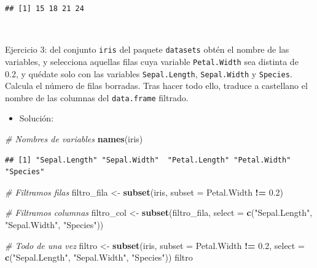 \documentclass[11pt,]{book}
\newenvironment{Shaded}{\begin{snugshade}}{\end{snugshade}}
\newcommand{\CommentTok}[1]{\textcolor[rgb]{0.37,0.37,0.37}{\textit{#1}}}
\newcommand{\DataTypeTok}[1]{\textcolor[rgb]{0.27,0.27,0.27}{#1}}
\newcommand{\FloatTok}[1]{\textcolor[rgb]{0.06,0.06,0.06}{#1}}
\newcommand{\KeywordTok}[1]{\textcolor[rgb]{0.27,0.27,0.27}{\textbf{#1}}}
\newcommand{\NormalTok}[1]{#1}
\newcommand{\OperatorTok}[1]{\textcolor[rgb]{0.43,0.43,0.43}{\textbf{#1}}}
\newcommand{\StringTok}[1]{\textcolor[rgb]{0.5,0.5,0.5}{#1}}
\providecommand{\tightlist}{%
  \setlength{\itemsep}{0pt}\setlength{\parskip}{0pt}}
\begin{document}
\begin{verbatim}
## [1] 15 18 21 24
\end{verbatim}

~

Ejercicio 3: del conjunto \texttt{iris} del paquete \texttt{datasets} obtén el nombre de las variables, y selecciona aquellas filas cuya variable \texttt{Petal.Width} sea distinta de 0.2, y quédate solo con las variables \texttt{Sepal.Length}, \texttt{Sepal.Width} y \texttt{Species}. Calcula el número de filas borradas. Tras hacer todo ello, traduce a castellano el nombre de las columnas del \texttt{data.frame} filtrado.

\begin{itemize}
\tightlist
\item
  Solución:
\end{itemize}

\begin{Shaded}
\begin{Highlighting}[]
\CommentTok{# Nombres de variables}
\KeywordTok{names}\NormalTok{(iris)}
\end{Highlighting}
\end{Shaded}

\begin{verbatim}
## [1] "Sepal.Length" "Sepal.Width"  "Petal.Length" "Petal.Width"  "Species"
\end{verbatim}

\begin{Shaded}
\begin{Highlighting}[]
\CommentTok{# Filtramos filas}
\NormalTok{filtro_fila <-}\StringTok{ }\KeywordTok{subset}\NormalTok{(iris, }\DataTypeTok{subset =}\NormalTok{ Petal.Width }\OperatorTok{!=}\StringTok{ }\FloatTok{0.2}\NormalTok{)}

\CommentTok{# Filtramos columnas}
\NormalTok{filtro_col <-}\StringTok{ }\KeywordTok{subset}\NormalTok{(filtro_fila,  }\DataTypeTok{select =} \KeywordTok{c}\NormalTok{(}\StringTok{"Sepal.Length"}\NormalTok{, }\StringTok{"Sepal.Width"}\NormalTok{, }\StringTok{"Species"}\NormalTok{))}

\CommentTok{# Todo de una vez}
\NormalTok{filtro <-}\StringTok{ }\KeywordTok{subset}\NormalTok{(iris, }\DataTypeTok{subset =}\NormalTok{ Petal.Width }\OperatorTok{!=}\StringTok{ }\FloatTok{0.2}\NormalTok{, }\DataTypeTok{select =} \KeywordTok{c}\NormalTok{(}\StringTok{"Sepal.Length"}\NormalTok{, }\StringTok{"Sepal.Width"}\NormalTok{, }\StringTok{"Species"}\NormalTok{))}
\NormalTok{filtro}
\end{Highlighting}
\end{Shaded}
\end{document}
